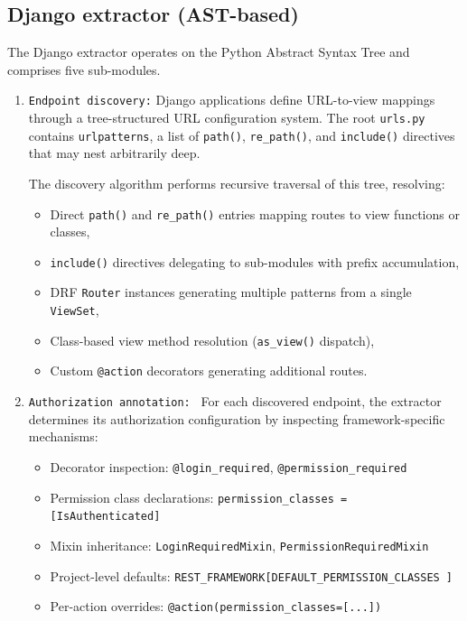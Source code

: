 \subsection{Django extractor (AST-based)}
\label{sec:det-django}

The Django extractor operates on the Python Abstract Syntax Tree and
comprises five sub-modules.

\begin{enumerate}


\item \texttt{Endpoint discovery:} Django applications define URL-to-view mappings through a tree-structured
URL configuration system. The root \texttt{urls.py} contains
\texttt{urlpatterns}, a list of \texttt{path()}, \texttt{re\_path()}, and
\texttt{include()} directives that may nest arbitrarily deep.

The discovery algorithm performs recursive traversal of this tree,
resolving:
\begin{itemize}
    \item Direct \texttt{path()} and \texttt{re\_path()} entries mapping
    routes to view functions or classes,
    \item \texttt{include()} directives delegating to sub-modules with
    prefix accumulation,
    \item DRF \texttt{Router} instances generating multiple patterns from a
    single \texttt{ViewSet},
    \item Class-based view method resolution (\texttt{as\_view()} dispatch),
    \item Custom \texttt{@action} decorators generating additional routes.
\end{itemize}

\item \texttt{Authorization annotation: } For each discovered endpoint, the extractor determines its authorization
configuration by inspecting framework-specific mechanisms:
\begin{itemize}
    \item Decorator inspection: \texttt{@login\_required},
    \texttt{@permission\_required}
    \item Permission class declarations:
    \texttt{permission\_classes = [IsAuthenticated]}
    \item Mixin inheritance: \texttt{LoginRequiredMixin},
    \texttt{PermissionRequiredMixin}
    \item Project-level defaults:
    \texttt{REST\_FRAMEWORK[\textquotesingle DEFAULT\_PERMISSION\_CLASSES%
    \textquotesingle]}
    \item Per-action overrides:
    \texttt{@action(permission\_classes=[...])}
\end{itemize}


\end{enumerate}
